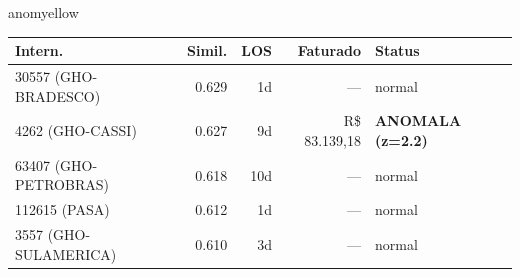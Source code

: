 \documentclass[a4paper,10pt]{article}
\begin{document}
\begin{anomalycard}[Internacao 118191 | GHO-BRADESCO | MODERADO (z=2.37)]{anomyellow}
\begin{tabular}{l r r r l}\toprule\textbf{Intern.} & \textbf{Simil.} & \textbf{LOS} & \textbf{Faturado} & \textbf{Status} \\\midrule
30557 (GHO-BRADESCO) & 0.629 & 1d & --- & \textcolor{jcubeblue}{normal} \\
4262 (GHO-CASSI) & 0.627 & 9d & R\$ 83.139,18 & \textcolor{anomred}{\textbf{ANOMALA (z=2.2)}} \\
63407 (GHO-PETROBRAS) & 0.618 & 10d & --- & \textcolor{jcubeblue}{normal} \\
112615 (PASA) & 0.612 & 1d & --- & \textcolor{jcubeblue}{normal} \\
3557 (GHO-SULAMERICA) & 0.610 & 3d & --- & \textcolor{jcubeblue}{normal} \\
\bottomrule\end{tabular}


\end{anomalycard}

\newpage
\end{document}
